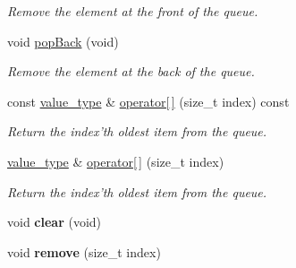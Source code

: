 \begin{DoxyCompactItemize}
\begin{DoxyCompactList}\small\item\em \-Remove the element at the front of the queue. \end{DoxyCompactList}\item 
\hypertarget{classxsens_1_1FifoQueue_adee7b4f0f0c30d8b29360755b4ef1e62}{void \hyperlink{classxsens_1_1FifoQueue_adee7b4f0f0c30d8b29360755b4ef1e62}{pop\-Back} (void)}\label{classxsens_1_1FifoQueue_adee7b4f0f0c30d8b29360755b4ef1e62}

\begin{DoxyCompactList}\small\item\em \-Remove the element at the back of the queue. \end{DoxyCompactList}\item 
\hypertarget{classxsens_1_1FifoQueue_ac08368440cbb0080eb970878bcc85eaa}{const \hyperlink{classxsens_1_1FifoQueue_a61949842c92df50f702496096b9d5069}{value\-\_\-type} \& \hyperlink{classxsens_1_1FifoQueue_ac08368440cbb0080eb970878bcc85eaa}{operator\mbox{[}$\,$\mbox{]}} (size\-\_\-t index) const }\label{classxsens_1_1FifoQueue_ac08368440cbb0080eb970878bcc85eaa}

\begin{DoxyCompactList}\small\item\em \-Return the index'th oldest item from the queue. \end{DoxyCompactList}\item 
\hypertarget{classxsens_1_1FifoQueue_a18a1acd59d9f6e0b7b52915134e4f3d3}{\hyperlink{classxsens_1_1FifoQueue_a61949842c92df50f702496096b9d5069}{value\-\_\-type} \& \hyperlink{classxsens_1_1FifoQueue_a18a1acd59d9f6e0b7b52915134e4f3d3}{operator\mbox{[}$\,$\mbox{]}} (size\-\_\-t index)}\label{classxsens_1_1FifoQueue_a18a1acd59d9f6e0b7b52915134e4f3d3}

\begin{DoxyCompactList}\small\item\em \-Return the index'th oldest item from the queue. \end{DoxyCompactList}\item 
\hypertarget{classxsens_1_1FifoQueue_a4ca3418799bc8e72e96dae1ede9b08ef}{void {\bfseries clear} (void)}\label{classxsens_1_1FifoQueue_a4ca3418799bc8e72e96dae1ede9b08ef}

\item 
\hypertarget{classxsens_1_1FifoQueue_af97f5a1f8232edf50b1d37b365ddb49a}{void {\bfseries remove} (size\-\_\-t index)}\label{classxsens_1_1FifoQueue_af97f5a1f8232edf50b1d37b365ddb49a}

\end{DoxyCompactItemize}
